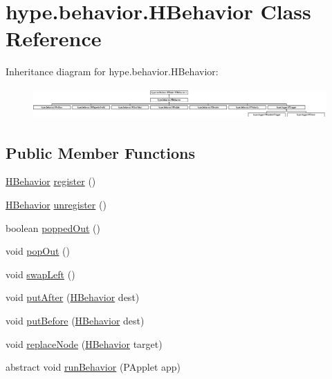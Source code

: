 \hypertarget{classhype_1_1behavior_1_1_h_behavior}{\section{hype.\-behavior.\-H\-Behavior Class Reference}
\label{classhype_1_1behavior_1_1_h_behavior}
}
Inheritance diagram for hype.\-behavior.\-H\-Behavior\-:\begin{figure}[H]
\begin{center}
\leavevmode
\includegraphics[height=1.181435cm]{classhype_1_1behavior_1_1_h_behavior}
\end{center}
\end{figure}
\subsection*{Public Member Functions}
\begin{DoxyCompactItemize}
\item 
\hyperlink{classhype_1_1behavior_1_1_h_behavior}{H\-Behavior} \hyperlink{classhype_1_1behavior_1_1_h_behavior_a56fc64be4b7a304cfab12f7f0e4e179d}{register} ()
\item 
\hyperlink{classhype_1_1behavior_1_1_h_behavior}{H\-Behavior} \hyperlink{classhype_1_1behavior_1_1_h_behavior_a4df843e46a62fa44241110c42233ca2e}{unregister} ()
\item 
boolean \hyperlink{classhype_1_1behavior_1_1_h_behavior_ab9f8ccacb6351edfdcfb6790941897b8}{popped\-Out} ()
\item 
void \hyperlink{classhype_1_1behavior_1_1_h_behavior_a738baf5080ed79e66f4b6b95d0961738}{pop\-Out} ()
\item 
void \hyperlink{classhype_1_1behavior_1_1_h_behavior_a949879d9bf640cba14c0541e761aa537}{swap\-Left} ()
\item 
void \hyperlink{classhype_1_1behavior_1_1_h_behavior_afb418e30c95a3ef5a9b395f21492ca28}{put\-After} (\hyperlink{classhype_1_1behavior_1_1_h_behavior}{H\-Behavior} dest)
\item 
void \hyperlink{classhype_1_1behavior_1_1_h_behavior_a512df1a5cde8877d272eeba609a97026}{put\-Before} (\hyperlink{classhype_1_1behavior_1_1_h_behavior}{H\-Behavior} dest)
\item 
void \hyperlink{classhype_1_1behavior_1_1_h_behavior_ae5d3a2d0ce2ee4bacbec9e0efe7cfd50}{replace\-Node} (\hyperlink{classhype_1_1behavior_1_1_h_behavior}{H\-Behavior} target)
\item 
abstract void \hyperlink{classhype_1_1behavior_1_1_h_behavior_a4b75d7f92a83e9121674588c1ebeb706}{run\-Behavior} (P\-Applet app)
\end{DoxyCompactItemize}
